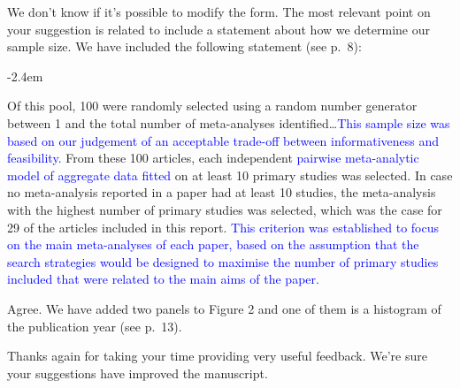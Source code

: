 \documentclass[draft]{article}
\renewenvironment{quote}{\begin{fquote}\advance\leftmargini -2.4em\begin{oldquote}}{\end{oldquote}\end{fquote}}
\newenvironment{fquote}
  {\def\FrameCommand{
	\fboxsep=0.6em %
	\fcolorbox{black}{white}}%
    \MakeFramed {\advance\hsize-2\width \FrameRestore}
    \begin{minipage}{\linewidth}
  }
  {\end{minipage}\endMakeFramed}
\begin{document}
We don't know if it's possible to modify the form. The most relevant point on your suggestion is related to include a statement about how we determine our sample size. We have included the following statement (see p.~8):

\begin{quote}
Of this pool, 100 were randomly selected using a random number generator between 1 and the total number of meta-analyses identified\ldots{}\textcolor{blue}{This sample size was based on our judgement of an acceptable trade-off between informativeness and feasibility.}
From these 100 articles, each independent \textcolor{blue} {pairwise meta-analytic model of aggregate data fitted} on at least 10 primary studies was selected. In case no meta-analysis reported in a paper had at least 10 studies, the meta-analysis with the highest number of primary studies was selected, which was the case for 29 of the articles included in this report. \textcolor{blue}{This criterion was established to focus on the main meta-analyses of each paper, based on the assumption that the search strategies would be designed to maximise the number of primary studies included that were related to the main aims of the paper.}
\end{quote}


Agree. We have added two panels to Figure 2 and one of them is a histogram of the publication year (see p.~13).

Thanks again for taking your time providing very useful feedback. We're sure your suggestions have improved the manuscript.
\end{document}
